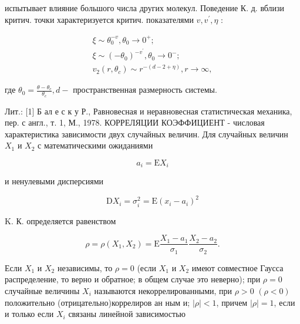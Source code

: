 \documentclass[10pt]{article}
\begin{document}
испытывает влияние большого числа других молекул. Поведение К. д. вблизи критич. точки характеризуется критич. показателями $v, v^{\prime}, \eta$ :



\[

\begin{gathered}

\xi \sim \theta_{0}^{-v}, \theta_{0} \rightarrow 0^{+} ; \\

\xi \sim\left(-\theta_{0}\right)^{-v^{\prime}}, \theta_{0} \rightarrow 0^{-} ; \\

v_{2}\left(r, \theta_{c}\right) \sim r^{-(d-2+\eta)}, r \rightarrow \infty,

\end{gathered}

\]



где $\theta_{0}=\frac{\theta-\theta_{c}}{\theta_{c}}, d-$ пространственная размерность системы.



Лит.: [1] Б ал е с к у Р., Равновесная и неравновесная статистическая механика, пер. с англ., т. 1, М., 1978. КОРРЕЛЯЦИИ КОЭФФИЦИЕНТ - числовая характеристика зависимости двух случайных величин. Для случайных величин $X_{1}$ и $X_{2}$ с математическими ожиданиями



\[

a_{i}=\mathrm{E} X_{i}

\]



и ненулевыми дисперсиями



\[

\mathrm{D} X_{i}=\sigma_{i}^{2}=\mathrm{E}\left(x_{i}-a_{i}\right)^{2}

\]



K. К. определяется равенством



\[

\rho=\rho\left(X_{1}, X_{2}\right)=\mathrm{E} \frac{X_{1}-a_{1}}{\sigma_{1}} \frac{X_{2}-a_{2}}{\sigma_{2}} .

\]



Если $X_{1}$ и $X_{2}$ независимы, то $\rho=0$ (если $X_{1}$ и $X_{2}$ имеют совместное Гаусса распределение, то верно и обратное; в общем случае это неверно); при $\rho=0$ случайные величины $X_{i}$ называются некоррелированными, при $\rho>0$ $(\rho<0)$ положительно (отрицательно)коррелиров ан ным и; $|\rho|<1$, причем $|\rho|=1$, если и только если $X_{i}$ связаны линейной зависимостью
\end{document}

